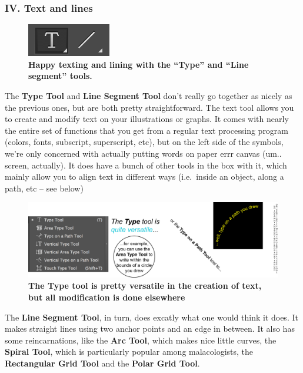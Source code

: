 \documentclass[]{article}
\begin{document}
\subsubsection{IV. Text and lines}\label{iv.-text-and-lines}

\begin{figure}
\centering
\includegraphics{Textlines.png}
\caption{\textbf{Happy texting and lining with the ``Type'' and ``Line
segment'' tools.}}
\end{figure}

The \textbf{Type Tool} and \textbf{Line Segment Tool} don't really go
together as nicely as the previous ones, but are both pretty
straightforward. The text tool allows you to create and modify text on
your illustrations or graphs. It comes with nearly the entire set of
functions that you get from a regular text processing program (colors,
fonts, subscript, superscript, etc), but on the left side of the
symbols, we're only concerned with actually putting words on paper errr
canvas (um.. screen, actually). It does have a bunch of other tools in
the box with it, which mainly allow you to align text in different ways
(i.e.~inside an object, along a path, etc -- see below)

\begin{figure}
\centering
\includegraphics{TypeTool2.png}
\caption{\textbf{The Type tool is pretty versatile in the creation of
text, but all modification is done elsewhere}}
\end{figure}

The \textbf{Line Segment Tool}, in turn, does excatly what one would
think it does. It makes straight lines using two anchor points and an
edge in between. It also has some reincarnations, like the \textbf{Arc
Tool}, which makes nice little curves, the \textbf{Spiral Tool}, which
is particularly popular among malacologists, the \textbf{Rectangular
Grid Tool} and the \textbf{Polar Grid Tool}.
\end{document}
